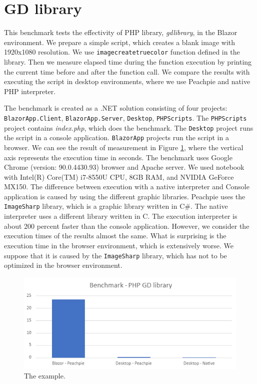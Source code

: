 \section{GD library}

This benchmark tests the effectivity of PHP library, \textit{gdlibrary}, in the Blazor environment.
We prepare a simple script, which creates a blank image with 1920x1080 resolution.
We use \texttt{imagecreatetruecolor} function defined in the library.
Then we measure elapsed time during the function execution by printing the current time before and after the function call.
We compare the results with executing the script in desktop environments, where we use Peachpie and native PHP interpreter.
\par
The benchmark is created as a .NET solution consisting of four projects: \texttt{BlazorApp.Client}, \texttt{BlazorApp.Server}, \texttt{Desktop}, \texttt{PHPScripts}.
The \texttt{PHPScripts} project contains \textit{index.php}, which does the benchmark.
The \texttt{Desktop} project runs the script in a console application.
\texttt{BlazorApp} projects run the script in a browser.
We can see the result of measurement in Figure \ref{img34:gd}, where the vertical axis represents the execution time in seconds.
The benchmark uses Google Chrome (version: 90.0.4430.93) browser and Apache server.
We used notebook with Intel(R) Core(TM) i7-8550U CPU, 8GB RAM, and NVIDIA GeForce MX150.
The difference between execution with a native interpreter and Console application is caused by using the different graphic libraries.
Peachpie uses the \texttt{ImageSharp} library, which is a graphic library written in C\#.
The native interpreter uses a different library written in C.
The execution interpreter is about 200 percent faster than the console application.
However, we consider the execution times of the results almost the same.
What is surprising is the execution time in the browser environment, which is extensively worse.
We suppose that it is caused by the \texttt{ImageSharp} library, which has not to be optimized in the browser environment.
\par
\begin{figure}[b!]\centering
\includegraphics{./img/gd}
\caption{The example.}
\label{img34:gd}
\end{figure} 
\par

